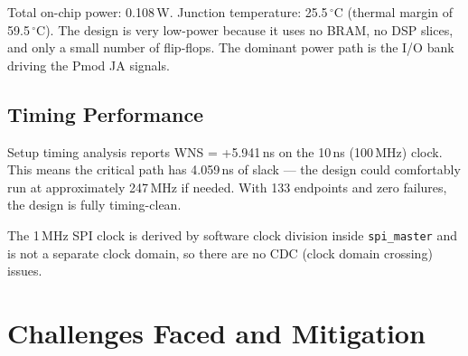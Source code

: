 \documentclass[12pt,a4paper]{report}
\begin{document}
Total on-chip power: 0.108\,W. Junction temperature: 25.5\,$^\circ$C (thermal margin of 59.5\,$^\circ$C). The design is very low-power because it uses no BRAM, no DSP slices, and only a small number of flip-flops. The dominant power path is the I/O bank driving the Pmod JA signals.

\section{Timing Performance}

Setup timing analysis reports WNS = +5.941\,ns on the 10\,ns (100\,MHz) clock. This means the critical path has 4.059\,ns of slack --- the design could comfortably run at approximately 247\,MHz if needed. With 133 endpoints and zero failures, the design is fully timing-clean.

The 1\,MHz SPI clock is derived by software clock division inside \texttt{spi\_master} and is not a separate clock domain, so there are no CDC (clock domain crossing) issues.

\chapter{Challenges Faced and Mitigation}
\end{document}
